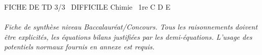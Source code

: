 \documentclass[11pt]{article}
\begin{document}
\begin{tcolorbox}[enhanced,colback=popink,colframe=popink,arc=10pt,boxrule=0pt,left=12pt,right=12pt,top=9pt,bottom=9pt]
{\color{white}\popxbold\small FICHE DE TD 3/3 \textbullet\ DIFFICILE \hfill Chimie \textbullet\ 1re C D E\par}
\end{tcolorbox}
\vspace{4pt}
\paragraph{}\textit{Fiche de synthèse niveau Baccalauréat/Concours. Tous les raisonnements doivent être explicités, les équations bilans justifiées par les demi-équations. L'usage des potentiels normaux fournis en annexe est requis.}
\end{document}
